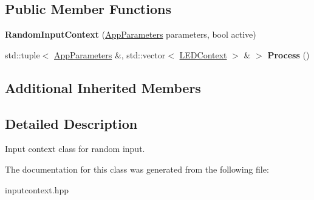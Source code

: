 \subsection*{Public Member Functions}
\begin{DoxyCompactItemize}
\item 
\mbox{\label{classRandomInputContext_ab2747e77324ec4e5dec7c19bbe8711bf}} 
{\bfseries Random\+Input\+Context} (\hyperlink{structAppParameters}{App\+Parameters} parameters, bool active)
\item 
\mbox{\label{classRandomInputContext_a19ab176510befce3e8f029cd946081f6}} 
std\+::tuple$<$ \hyperlink{structAppParameters}{App\+Parameters} \&, std\+::vector$<$ \hyperlink{classLEDContext}{L\+E\+D\+Context} $>$ \& $>$ {\bfseries Process} ()
\end{DoxyCompactItemize}
\subsection*{Additional Inherited Members}


\subsection{Detailed Description}
Input context class for random input. 

The documentation for this class was generated from the following file\+:\begin{DoxyCompactItemize}
\item 
inputcontext.\+hpp\end{DoxyCompactItemize}
